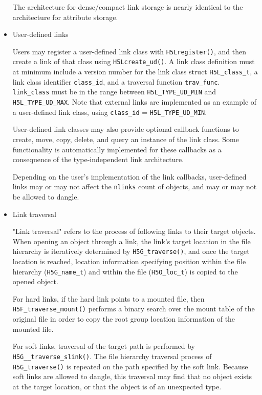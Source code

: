 \begin{itemize}
The architecture for dense/compact link storage is nearly identical to the architecture for attribute storage.

    \item User-defined links

Users may register a user-defined link class with \texttt{H5Lregister()}, and then create a link of that class using \texttt{H5Lcreate\_ud()}. A link class definition must at minimum include a version number for the link class struct \texttt{H5L\_class\_t}, a link class identifier \texttt{class\_id}, and a traversal function \texttt{trav\_func}. \texttt{link\_class} must be in the range between \texttt{H5L\_TYPE\_UD\_MIN} and \texttt{H5L\_TYPE\_UD\_MAX}. Note that external links are implemented as an example of a user-defined link class, using \texttt{class\_id} = \texttt{H5L\_TYPE\_UD\_MIN}.

User-defined link classes may also provide optional callback functions to create, move, copy, delete, and query an instance of the link class. Some functionality is automatically implemented for these callbacks as a consequence of the type-independent link architecture. 

Depending on the user's implementation of the link callbacks, user-defined links may or may not affect the \texttt{nlinks} count of objects, and may or may not be allowed to dangle.

    \item Link traversal

"Link traversal" refers to the process of following links to their target objects. When opening an object through a link, the link's target location in the file hierarchy is iteratively determined by \texttt{H5G\_traverse()}, and once the target location is reached, location information specifying position within the file hierarchy (\texttt{H5G\_name\_t}) and within the file (\texttt{H5O\_loc\_t}) is copied to the opened object.

For hard links, if the hard link points to a mounted file, then \texttt{H5F\_traverse\_mount()} performs a binary search over the mount table of the original file in order to copy the root group location information of the mounted file. 

For soft links, traversal of the target path is performed by \texttt{H5G\_\_traverse\_slink()}. The file hierarchy traversal process of \texttt{H5G\_traverse()} is repeated on the path specified by the soft link. Because soft links are allowed to dangle, this traversal may find that no object exists at the target location, or that the object is of an unexpected type.


\end{itemize}
